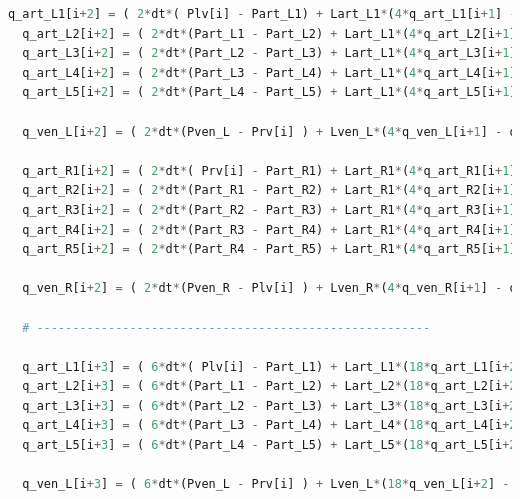 \begin{lstlisting}[language=Python,caption={Математическая модель сердечно-сосудистой системы на языке программирования Python},label={list:cardiovascular_system_model}]
  q_art_L1[i+2] = ( 2*dt*( Plv[i] - Part_L1) + Lart_L1*(4*q_art_L1[i+1] - q_art_L1[i]) ) / (3*Lart_L1 + 2*dt*(Rart_L1 + Rav)) 
  q_art_L2[i+2] = ( 2*dt*(Part_L1 - Part_L2) + Lart_L1*(4*q_art_L2[i+1] - q_art_L2[i]) ) / (3*Lart_L1 + 2*dt*Rart_L1)
  q_art_L3[i+2] = ( 2*dt*(Part_L2 - Part_L3) + Lart_L1*(4*q_art_L3[i+1] - q_art_L3[i]) ) / (3*Lart_L1 + 2*dt*Rart_L1)
  q_art_L4[i+2] = ( 2*dt*(Part_L3 - Part_L4) + Lart_L1*(4*q_art_L4[i+1] - q_art_L4[i]) ) / (3*Lart_L1 + 2*dt*Rart_L1)
  q_art_L5[i+2] = ( 2*dt*(Part_L4 - Part_L5) + Lart_L1*(4*q_art_L5[i+1] - q_art_L5[i]) ) / (3*Lart_L1 + 2*dt*Rart_L1)

  q_ven_L[i+2] = ( 2*dt*(Pven_L - Prv[i] ) + Lven_L*(4*q_ven_L[i+1] - q_ven_L[i]) ) / (3*Lven_L + 2*dt*(Rven_L + Rtr)) 

  q_art_R1[i+2] = ( 2*dt*( Prv[i] - Part_R1) + Lart_R1*(4*q_art_R1[i+1] - q_art_R1[i]) ) / (3*Lart_R1 + 2*dt*(Rart_R1 + Rpv)) 
  q_art_R2[i+2] = ( 2*dt*(Part_R1 - Part_R2) + Lart_R1*(4*q_art_R2[i+1] - q_art_R2[i]) ) / (3*Lart_R1 + 2*dt*Rart_R1)
  q_art_R3[i+2] = ( 2*dt*(Part_R2 - Part_R3) + Lart_R1*(4*q_art_R3[i+1] - q_art_R3[i]) ) / (3*Lart_R1 + 2*dt*Rart_R1)
  q_art_R4[i+2] = ( 2*dt*(Part_R3 - Part_R4) + Lart_R1*(4*q_art_R4[i+1] - q_art_R4[i]) ) / (3*Lart_R1 + 2*dt*Rart_R1)
  q_art_R5[i+2] = ( 2*dt*(Part_R4 - Part_R5) + Lart_R1*(4*q_art_R5[i+1] - q_art_R5[i]) ) / (3*Lart_R1 + 2*dt*Rart_R1)

  q_ven_R[i+2] = ( 2*dt*(Pven_R - Plv[i] ) + Lven_R*(4*q_ven_R[i+1] - q_ven_R[i]) ) / (3*Lven_R + 2*dt*(Rven_R + Rmv)) 

  # -------------------------------------------------------

  q_art_L1[i+3] = ( 6*dt*( Plv[i] - Part_L1) + Lart_L1*(18*q_art_L1[i+2] - 9*q_art_L1[i+1] + 2*q_art_L1[i]) ) / (11*Lart_L1 + 6*dt*(Rart_L1 + Rav)) 
  q_art_L2[i+3] = ( 6*dt*(Part_L1 - Part_L2) + Lart_L2*(18*q_art_L2[i+2] - 9*q_art_L2[i+1] + 2*q_art_L2[i]) ) / (11*Lart_L2 + 6*dt*Rart_L2)
  q_art_L3[i+3] = ( 6*dt*(Part_L2 - Part_L3) + Lart_L3*(18*q_art_L3[i+2] - 9*q_art_L3[i+1] + 2*q_art_L3[i]) ) / (11*Lart_L3 + 6*dt*Rart_L3)
  q_art_L4[i+3] = ( 6*dt*(Part_L3 - Part_L4) + Lart_L4*(18*q_art_L4[i+2] - 9*q_art_L4[i+1] + 2*q_art_L4[i]) ) / (11*Lart_L4 + 6*dt*Rart_L4)
  q_art_L5[i+3] = ( 6*dt*(Part_L4 - Part_L5) + Lart_L5*(18*q_art_L5[i+2] - 9*q_art_L5[i+1] + 2*q_art_L5[i]) ) / (11*Lart_L5 + 6*dt*Rart_L5)

  q_ven_L[i+3] = ( 6*dt*(Pven_L - Prv[i] ) + Lven_L*(18*q_ven_L[i+2] - 9*q_ven_L[i+1] + 2*q_ven_L[i]) ) / (11*Lven_L + 6*dt*(Rven_L + Rtr))


\end{lstlisting}
